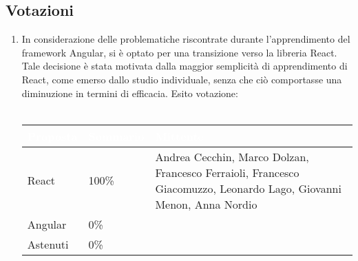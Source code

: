 \subsection{Votazioni} \label{subsec:resvotazione}
\begin{enumerate}
    \item In considerazione delle problematiche riscontrate durante l'apprendimento del framework Angular, si è optato per una transizione verso la libreria React. Tale decisione è stata motivata dalla maggior semplicità di apprendimento di React, come emerso dallo studio individuale, senza che ciò comportasse una diminuzione in termini di efficacia.
    Esito votazione: \\\\
    \begingroup
        \setlength{\tabcolsep}{10pt}
        \renewcommand{\arraystretch}{1.5}
        \begin{tabularx}{0.93\textwidth}{| l | l | X |}
             \hline
             \rowcolor{headerrow}\textbf{\textcolor{white}{Proposta}} & \textbf{\textcolor{white}{Sommario}} & \textbf{\textcolor{white}{Mittente}} \\
             \hline
             React & 100\%  & Andrea Cecchin, Marco Dolzan, Francesco Ferraioli, Francesco Giacomuzzo, Leonardo Lago, Giovanni Menon, Anna Nordio\\
             \hline
             Angular & 0\% &  \\
             \hline
             Astenuti & 0\% & \\
             \hline
        \end{tabularx}
    \endgroup
\end{enumerate}


